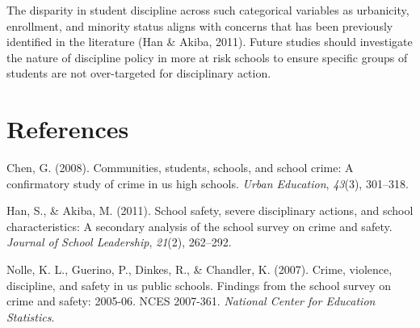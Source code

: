 \documentclass[
  man, fleqn, noextraspace]{apa6}
\begin{document}
The disparity in student discipline across such categorical variables as urbanicity, enrollment, and minority status aligns with concerns that has been previously identified in the literature (Han \& Akiba, 2011). Future studies should investigate the nature of discipline policy in more at risk schools to ensure specific groups of students are not over-targeted for disciplinary action.

\newpage

\hypertarget{references}{%
\section{References}\label{references}}

\begingroup
\setlength{\parindent}{-0.5in}
\setlength{\leftskip}{0.5in}

\hypertarget{refs}{}
\leavevmode\hypertarget{ref-chen2008}{}%
Chen, G. (2008). Communities, students, schools, and school crime: A confirmatory study of crime in us high schools. \emph{Urban Education}, \emph{43}(3), 301--318.

\leavevmode\hypertarget{ref-han2011}{}%
Han, S., \& Akiba, M. (2011). School safety, severe disciplinary actions, and school characteristics: A secondary analysis of the school survey on crime and safety. \emph{Journal of School Leadership}, \emph{21}(2), 262--292.

\leavevmode\hypertarget{ref-nolle2007}{}%
Nolle, K. L., Guerino, P., Dinkes, R., \& Chandler, K. (2007). Crime, violence, discipline, and safety in us public schools. Findings from the school survey on crime and safety: 2005-06. NCES 2007-361. \emph{National Center for Education Statistics}.

\endgroup
\end{document}
